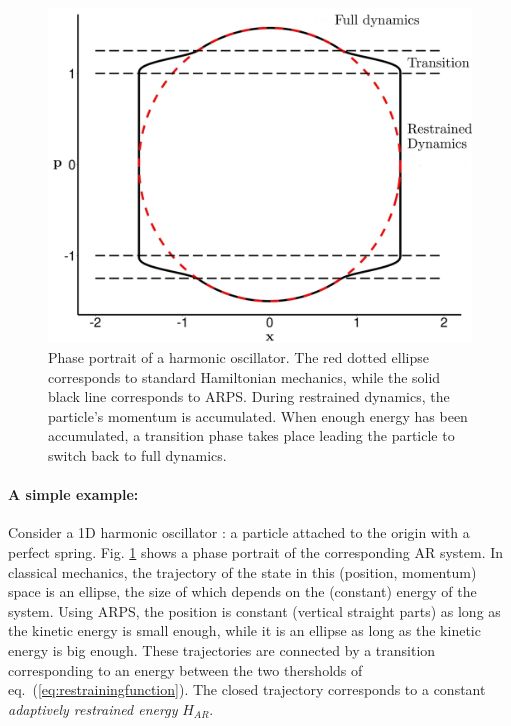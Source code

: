 \begin{figure}[htb]
  \centering
  \includegraphics[width=0.8\linewidth]{images/arps-vriphys2013/harmonicOscillatorPhasePortraitraw_hacked.png}
  \caption[ARPS: Phase portrait of a ARPS harmonic oscillator]{\label{fig:harmonicOscillatorPhasePortrait} Phase portrait of a harmonic oscillator. The red dotted ellipse corresponds to standard Hamiltonian mechanics, while the solid black line corresponds to ARPS. During restrained dynamics, the particle's momentum is accumulated. When enough energy has been accumulated, a transition phase takes place leading the particle to switch back to full dynamics.}
\end{figure}

\paragraph*{A simple example:}
Consider a 1D harmonic oscillator : a particle attached to the origin with a perfect spring.
Fig. \ref{fig:harmonicOscillatorPhasePortrait} shows a phase portrait of the corresponding
AR system.
In classical mechanics, the trajectory of the state in this (position, momentum) space is an ellipse, the size of which depends on the (constant) energy of the system.
Using ARPS, the position is constant (vertical straight parts) as long as the kinetic energy is small enough, while it is an ellipse as long as the kinetic energy is big enough.
These trajectories are connected by a transition corresponding to an energy between the two thersholds of eq.~(\ref{eq:restrainingfunction}).
The closed trajectory corresponds to a constant \textit{adaptively restrained energy} $H_{AR}$.

